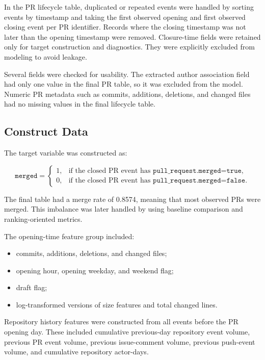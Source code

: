 In the PR lifecycle table, duplicated or repeated events were handled by sorting events by timestamp and
taking the first observed opening and first observed closing event per PR identifier. Records where the
closing timestamp was not later than the opening timestamp were removed. Closure-time fields were retained
only for target construction and diagnostics. They were explicitly excluded from modeling to avoid leakage.

Several fields were checked for usability. The extracted author association field had only one value in the
final PR table, so it was excluded from the model. Numeric PR metadata such as commits, additions, deletions,
and changed files had no missing values in the final lifecycle table.

\subsection{Construct Data}

The target variable was constructed as:

\[
    \texttt{merged} =
    \begin{cases}
        1, & \text{if the closed PR event has } \texttt{pull\_request.merged=true},\\
        0, & \text{if the closed PR event has } \texttt{pull\_request.merged=false}.
    \end{cases}
\]

The final table had a merge rate of 0.8574, meaning that most observed PRs were merged. This imbalance was
later handled by using baseline comparison and ranking-oriented metrics.

The opening-time feature group included:

\begin{itemize}
    \item commits, additions, deletions, and changed files;
    \item opening hour, opening weekday, and weekend flag;
    \item draft flag;
    \item log-transformed versions of size features and total changed lines.
\end{itemize}

Repository history features were constructed from all events before the PR opening day. These included
cumulative previous-day repository event volume, previous PR event volume, previous issue-comment volume,
previous push-event volume, and cumulative repository actor-days.

